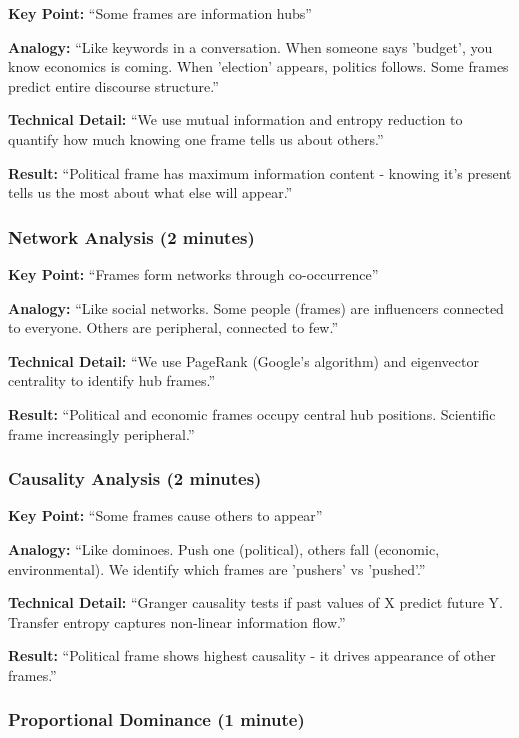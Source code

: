 \documentclass[11pt]{article}
\begin{document}
\textbf{Key Point:} ``Some frames are information hubs''

\textbf{Analogy:} ``Like keywords in a conversation. When someone says 'budget', you know economics is coming. When 'election' appears, politics follows. Some frames predict entire discourse structure.''

\textbf{Technical Detail:} ``We use mutual information and entropy reduction to quantify how much knowing one frame tells us about others.''

\textbf{Result:} ``Political frame has maximum information content - knowing it's present tells us the most about what else will appear.''

\subsubsection{Network Analysis (2 minutes)}

\textbf{Key Point:} ``Frames form networks through co-occurrence''

\textbf{Analogy:} ``Like social networks. Some people (frames) are influencers connected to everyone. Others are peripheral, connected to few.''

\textbf{Technical Detail:} ``We use PageRank (Google's algorithm) and eigenvector centrality to identify hub frames.''

\textbf{Result:} ``Political and economic frames occupy central hub positions. Scientific frame increasingly peripheral.''

\subsubsection{Causality Analysis (2 minutes)}

\textbf{Key Point:} ``Some frames cause others to appear''

\textbf{Analogy:} ``Like dominoes. Push one (political), others fall (economic, environmental). We identify which frames are 'pushers' vs 'pushed'.''

\textbf{Technical Detail:} ``Granger causality tests if past values of X predict future Y. Transfer entropy captures non-linear information flow.''

\textbf{Result:} ``Political frame shows highest causality - it drives appearance of other frames.''

\subsubsection{Proportional Dominance (1 minute)}
\end{document}
